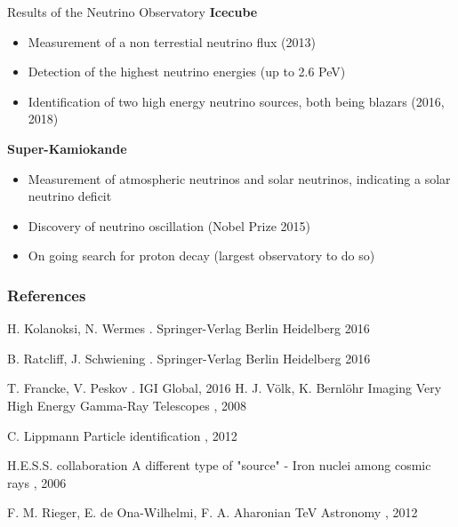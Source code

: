 \documentclass[aspectratio=1610, 10pt]{beamer}
\begin{document}
\begin{frame}{Results of the Neutrino Observatory}
\textbf{Icecube}
 \begin{itemize}
   \item Measurement of a non terrestial neutrino flux (2013)
   \medskip
   \item Detection of the highest neutrino energies (up to 2.6 PeV)
   \medskip
   \item Identification of two high energy neutrino sources, both being blazars (2016, 2018)
 \end{itemize}
\vspace{0.5cm}
\textbf{Super-Kamiokande}
  \begin{itemize}
    \item Measurement of atmospheric neutrinos and solar neutrinos, indicating a solar neutrino deficit
    \medskip
    \item Discovery of neutrino oscillation (Nobel Prize 2015)
    \medskip
    \item On going search for proton decay (largest observatory to do so)
  \end{itemize}
\end{frame}



\begin{frame}[allowframebreaks]
        \frametitle{References}
        
     \begin{thebibliography}{10}
        \beamertemplatebookbibitems
          H. Kolanoksi, N. Wermes
          .
          \newblock  Springer-Verlag Berlin Heidelberg 2016

          B. Ratcliff, J. Schwiening
          .
          \newblock  Springer-Verlag Berlin Heidelberg 2016

          T. Francke, V. Peskov
          .
          \newblock  IGI Global, 2016
          \beamertemplatearticlebibitems
            H. J. Völk, K. Bernlöhr
            \newblock Imaging Very High Energy Gamma-Ray Telescopes
            , 2008

            C. Lippmann
            \newblock Particle identification
            , 2012

             H.E.S.S. collaboration
            \newblock A different type of "source" - Iron nuclei among cosmic rays
            , 2006

             F. M. Rieger, E. de Ona-Wilhelmi, F. A. Aharonian
            \newblock TeV Astronomy
            , 2012
      \end{thebibliography}
\end{frame}
\end{document}
